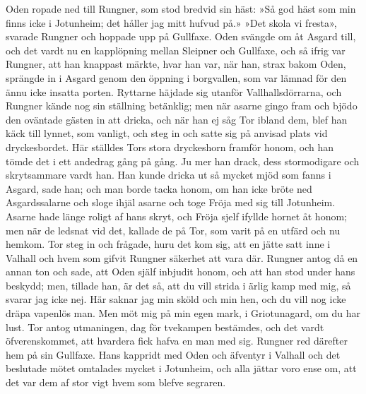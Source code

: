 Oden ropade ned till Rungner, som stod bredvid sin häst: »Så god häst
som min finns icke i Jotunheim; det håller jag mitt hufvud på.» »Det
skola vi fresta», svarade Rungner och hoppade upp på Gullfaxe. Oden
svängde om åt Asgard till, och det vardt nu en kapplöpning mellan
Sleipner och Gullfaxe, och så ifrig var Rungner, att han knappast
märkte, hvar han var, när han, strax bakom Oden, sprängde in i
\protect\hypertarget{lb1625905.xhtmlux5cux23start64}{}{}\protect\hypertarget{lb1625905.xhtmlux5cux23start64-a}{}{}\protect\hypertarget{lb1625905.xhtmlux5cux23start64-b}{}{}\protect\hypertarget{lb1625905.xhtmlux5cux23start64-c}{}{}\protect\hypertarget{lb1625905.xhtmlux5cux23start64-d}{}{}
Asgard genom den öppning i borgvallen, som var lämnad för den ännu icke
insatta porten. Ryttarne häjdade sig utanför Vallhallsdörrarna, och
Rungner kände nog sin ställning betänklig; men när asarne gingo fram och
bjödo den oväntade gästen in att dricka, och när han ej såg Tor ibland
dem, blef han käck till lynnet, som vanligt, och steg in och satte sig
på anvisad plats vid dryckesbordet. Här ställdes Tors stora dryckeshorn
framför honom, och han tömde det i ett andedrag gång på gång. Ju mer han
drack, dess stormodigare och skrytsammare vardt han. Han kunde dricka ut
så mycket mjöd som fanns i Asgard, sade han; och man borde tacka honom,
om han icke bröte ned Asgardssalarne och sloge ihjäl asarne och toge
Fröja med sig till Jotunheim. Asarne hade länge roligt af hans skryt,
och Fröja sjelf ifyllde hornet åt honom; men när de ledsnat vid det,
kallade de på Tor, som varit på en utfärd och nu hemkom. Tor steg in och
frågade, huru det kom sig, att en jätte satt inne i Valhall och hvem som
gifvit Rungner säkerhet att vara där. Rungner antog då en annan ton och
sade, att Oden själf inbjudit honom, och att han stod under hans
beskydd; men, tillade han, är det så, att du vill strida i ärlig kamp
med mig, så svarar jag icke nej. Här saknar jag min sköld och min hen,
och du vill nog icke dräpa vapenlös man. Men möt mig på min egen mark, i
Griotunagard, om du har lust. Tor antog utmaningen, dag för tvekampen
bestämdes, och det vardt öfverenskommet, att hvardera fick hafva en man
med sig. Rungner red därefter hem på sin Gullfaxe. Hans kappridt med
Oden och äfventyr i Valhall och det beslutade mötet omtalades mycket i
Jotunheim, och alla jättar voro ense om, att det var dem af stor vigt
hvem som blefve segraren.

